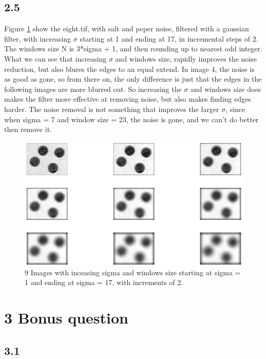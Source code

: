 \documentclass[11pt]{report}
\begin{document}
\subsection{2.5}

Figure \ref{fig:2_5} show the eight.tif, with salt and peper noise, filtered with a gaussian filter, with increasing $\sigma$ starting at 1 and ending at 17, in incremental steps of 2. The windows size N is 3*sigma + 1, and then rounding up to nearest odd integer. What we can see that increasing $\sigma$ and windows size, rapidly improves the noise reduction, but also blures the edges to an equal extend. In image 4, the noise is as good as gone, so from there on, the only difference is just that the edges in the following images are more blurred out. So increasing the $\sigma$ and windows size does makes the filter more effective at removing noise, but also makes finding edges harder. The noise removal is not something that improves the larger $\sigma$, since when sigma = 7 and window size = 23, the noise is gone, and we can't do better then remove it.
\begin{figure}[!ht]
    \centering
    \includegraphics[width=1\textwidth]{fig25.jpg}
    \caption{9 Images with inceasing sigma and windows size starting at sigma = 1 and ending at sigma = 17, with increments of 2.}
    \label{fig:2_5}
\end{figure}

\section{3 Bonus question}

\subsection{3.1}
\end{document}
